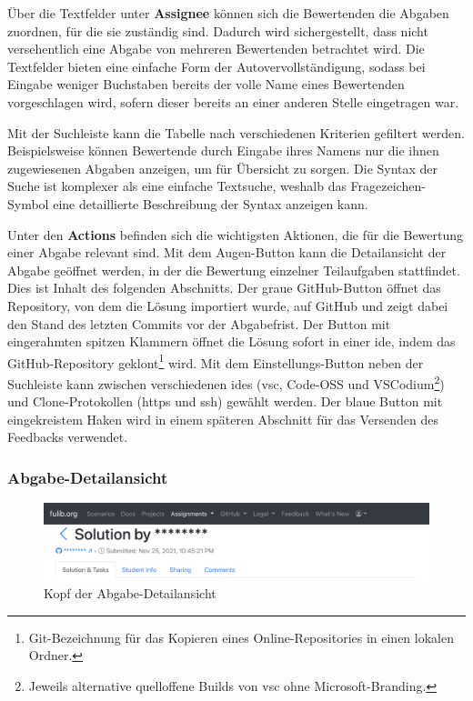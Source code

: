 Über die Textfelder unter \textbf{Assignee} können sich die Bewertenden die Abgaben zuordnen, für die sie zuständig sind.
Dadurch wird sichergestellt, dass nicht versehentlich eine Abgabe von mehreren Bewertenden betrachtet wird.
Die Textfelder bieten eine einfache Form der Autovervollständigung, sodass bei Eingabe weniger Buchstaben bereits der volle Name eines Bewertenden vorgeschlagen wird, sofern dieser bereits an einer anderen Stelle eingetragen war.

Mit der Suchleiste kann die Tabelle nach verschiedenen Kriterien gefiltert werden.
Beispielsweise können Bewertende durch Eingabe ihres Namens nur die ihnen zugewiesenen Abgaben anzeigen, um für Übersicht zu sorgen.
Die Syntax der Suche ist komplexer als eine einfache Textsuche, weshalb das Fragezeichen-Symbol eine detaillierte Beschreibung der Syntax anzeigen kann.

Unter den \textbf{Actions} befinden sich die wichtigsten Aktionen, die für die Bewertung einer Abgabe relevant sind.
Mit dem Augen-Button kann die Detailansicht der Abgabe geöffnet werden, in der die Bewertung einzelner Teilaufgaben stattfindet.
Dies ist Inhalt des folgenden Abschnitts.
Der graue GitHub-Button öffnet das Repository, von dem die Lösung importiert wurde, auf GitHub und zeigt dabei den Stand des letzten Commits vor der Abgabefrist.
Der Button mit eingerahmten spitzen Klammern öffnet die Lösung sofort in einer \ac{ide}, indem das GitHub-Repository geklont\footnote{
    Git-Bezeichnung für das Kopieren eines Online-Repositories in einen lokalen Ordner.
} wird.
Mit dem Einstellungs-Button neben der Suchleiste kann zwischen verschiedenen \acp{ide} (\ac{vsc}, Code-OSS und VSCodium\footnote{
    Jeweils alternative quelloffene Builds von \ac{vsc} ohne Microsoft-Branding.
}) und Clone-Protokollen (https und ssh) gewählt werden.
Der blaue Button mit eingekreistem Haken wird in einem späteren Abschnitt für das Versenden des Feedbacks verwendet.

\subsubsection{Abgabe-Detailansicht}

\begin{figure}
    \centering
    \includegraphics[width=\textwidth]{images/solution-head}
    \caption{Kopf der Abgabe-Detailansicht}
    \label{fig:solution-head}
\end{figure}



